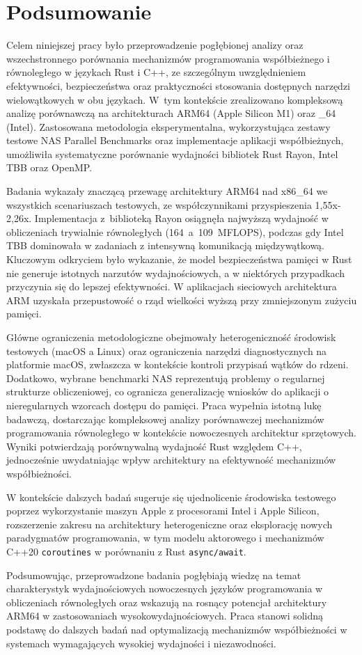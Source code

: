 \chapter{Podsumowanie}
Celem niniejszej pracy było przeprowadzenie pogłębionej analizy oraz wszechstronnego porównania mechanizmów programowania współbieżnego i równoległego w językach Rust i C++, ze szczególnym uwzględnieniem efektywności, bezpieczeństwa oraz praktyczności stosowania dostępnych narzędzi wielowątkowych w obu językach. W~tym kontekście zrealizowano kompleksową analizę porównawczą na architekturach ARM64 (Apple Silicon M1) oraz \_64 \mbox{(Intel)}. Zastosowana metodologia eksperymentalna, wykorzystująca zestawy testowe NAS Parallel Benchmarks oraz implementacje aplikacji współbieżnych, umożliwiła systematyczne porównanie wydajności bibliotek Rust Rayon, Intel TBB oraz OpenMP.

Badania wykazały znaczącą przewagę architektury ARM64 nad x86\_64 we wszystkich scenariuszach testowych, ze współczynnikami przyspieszenia 1,55x-2,26x. Implementacja z~biblioteką Rayon osiągnęła najwyższą wydajność w obliczeniach trywialnie równoległych \mbox{(164 a 109 MFLOPS)}, podczas gdy Intel TBB dominowała w zadaniach z intensywną komunikacją międzywątkową. Kluczowym odkryciem było wykazanie, że model bezpieczeństwa pamięci w Rust nie generuje istotnych narzutów wydajnościowych, a w niektórych przypadkach przyczynia się do lepszej efektywności. W aplikacjach sieciowych architektura ARM uzyskała przepustowość o rząd wielkości wyższą przy zmniejszonym zużyciu pamięci.

Główne ograniczenia metodologiczne obejmowały heterogeniczność środowisk testowych (macOS a Linux) oraz ograniczenia narzędzi diagnostycznych na platformie macOS, zwłaszcza w kontekście kontroli przypisań wątków do rdzeni. Dodatkowo, wybrane benchmarki NAS reprezentują problemy o regularnej strukturze obliczeniowej, co ogranicza generalizację wniosków do aplikacji o nieregularnych wzorcach dostępu do pamięci.
Praca wypełnia istotną lukę badawczą, dostarczając kompleksowej analizy porównawczej mechanizmów programowania równoległego w kontekście nowoczesnych architektur sprzętowych. Wyniki potwierdzają porównywalną wydajność Rust względem C++, jednocześnie uwydatniając wpływ architektury na efektywność mechanizmów współbieżności.

W kontekście dalszych badań sugeruje się ujednolicenie środowiska testowego poprzez wykorzystanie maszyn Apple z procesorami Intel i Apple Silicon, rozszerzenie zakresu na architektury heterogeniczne oraz eksplorację nowych paradygmatów programowania, w tym modelu aktorowego i mechanizmów C++20 \texttt{coroutines} w porównaniu z Rust \texttt{async/await}.

Podsumowując, przeprowadzone badania pogłębiają wiedzę na temat charakterystyk wydajnościowych nowoczesnych języków programowania w obliczeniach równoległych oraz wskazują na rosnący potencjał architektury ARM64 w zastosowaniach wysokowydajnościowych. Praca stanowi solidną podstawę do dalszych badań nad optymalizacją mechanizmów współbieżności w systemach wymagających wysokiej wydajności i niezawodności.